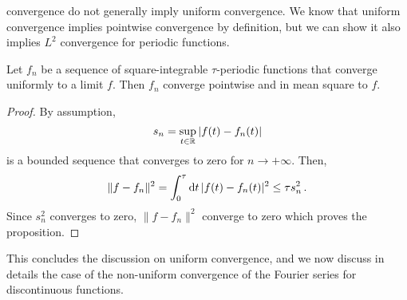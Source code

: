 convergence do not generally imply uniform convergence. We know that uniform convergence
implies pointwise convergence by definition, but we can show it also implies $L^2$
convergence for periodic functions.
\begin{proposition}
  \label{prop:uniconv-l2conv}
  Let $f_n$ be a sequence of square-integrable $\tau$-periodic functions that converge
  uniformly to a limit $f$. Then $f_n$ converge pointwise and in mean square to $f$.
\end{proposition}
\begin{proof}
  By assumption,
  \begin{equation}
    s_n=\sup_{t\in\mathbb{R}}|f(t)-f_n(t)|
  \end{equation}
  is a bounded sequence that converges to zero for $n\to+\infty$. Then,
  \begin{equation}
    \|f-f_n\|^2=\int_{0}^{\tau}\mathrm{d} t\,|f(t)-f_n(t)|^2\leq \tau s_n^2\,.
  \end{equation}
  Since $s_n^2$ converges to zero, $\|f-f_n\|^2$ converge to zero which proves the
  proposition.
\end{proof}

This concludes the discussion on uniform convergence, and we now discuss in details the
case of the non-uniform convergence of the Fourier series for discontinuous functions.

